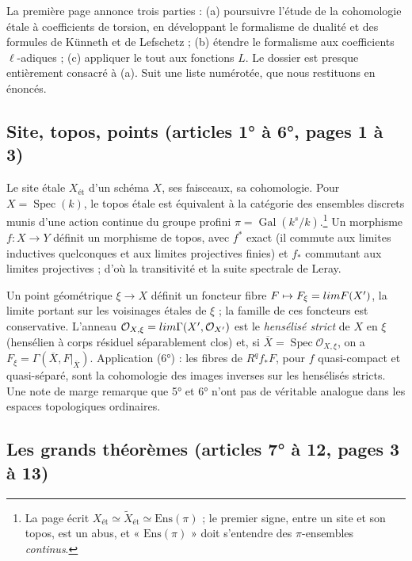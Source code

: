 \documentclass[11pt,a4paper]{article}
\begin{document}
La première page annonce trois parties : (a) poursuivre l'étude de la
cohomologie étale à coefficients de torsion, en développant le formalisme de
dualité et des formules de Künneth et de Lefschetz ; (b) étendre le formalisme
aux coefficients $\ell$-adiques ; (c) appliquer le tout aux fonctions $L$. Le
dossier est presque entièrement consacré à (a). Suit une liste numérotée, que
nous restituons en énoncés.

\subsection*{Site, topos, points (articles 1° à 6°, pages 1 à 3)}

Le site étale $X_{\text{ét}}$ d'un schéma $X$, ses faisceaux, sa cohomologie.
Pour $X = \operatorname{Spec}(k)$, le topos étale est équivalent à la catégorie
des ensembles discrets munis d'une action continue du groupe profini
$\pi = \operatorname{Gal}(k^{s}/k)$.\footnote{La page écrit
$X_{\text{ét}} \simeq \widetilde{X}_{\text{ét}} \simeq \mathrm{Ens}(\pi)$ ; le
premier signe, entre un site et son topos, est un abus, et
« $\mathrm{Ens}(\pi)$ » doit s'entendre des $\pi$-ensembles \emph{continus}.}
Un morphisme $f : X \to Y$ définit un morphisme de topos, avec $f^{*}$ exact
(il commute aux limites inductives quelconques et aux limites projectives
finies) et $f_{*}$ commutant aux limites projectives ; d'où la transitivité et
la suite spectrale de Leray.

Un point géométrique $\xi \to X$ définit un foncteur fibre $F \mapsto F_{\xi} =
\varinjlim F(X')$, la limite portant sur les voisinages étales de $\xi$ ; la
famille de ces foncteurs est conservative. L'anneau
$\mathcal{O}_{X,\xi} = \varinjlim \Gamma(X', \mathcal{O}_{X'})$ est le
\emph{hensélisé strict} de $X$ en $\xi$ (hensélien à corps résiduel
séparablement clos) et, si $\overline{X} = \operatorname{Spec}
\mathcal{O}_{X,\xi}$, on a $F_{\xi} = \Gamma(\overline{X}, F|_{\overline{X}})$.
Application (6°) : les fibres de $R^{q}f_{*}F$, pour $f$ quasi-compact et
quasi-séparé, sont la cohomologie des images inverses sur les hensélisés
stricts. Une note de marge remarque que 5° et 6° n'ont pas de véritable
analogue dans les espaces topologiques ordinaires.

\subsection*{Les grands théorèmes (articles 7° à 12, pages 3 à 13)}
\end{document}
